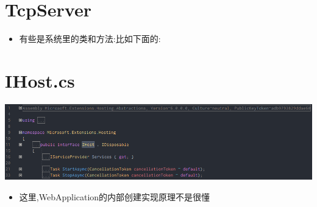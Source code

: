 \documentclass[9pt, b5paper]{article}
\begin{document}
\section{TcpServer}
\label{sec-2}
\begin{itemize}
\item 有些是系统里的类和方法:比如下面的:
\end{itemize}
\section{IHost.cs}
\label{sec-3}

\includegraphics[width=.9\linewidth]{./pic/readme_20230101_222709.png}
\begin{itemize}
\item 这里,WebApplication的内部创建实现原理不是很懂
\end{itemize}
\end{document}
